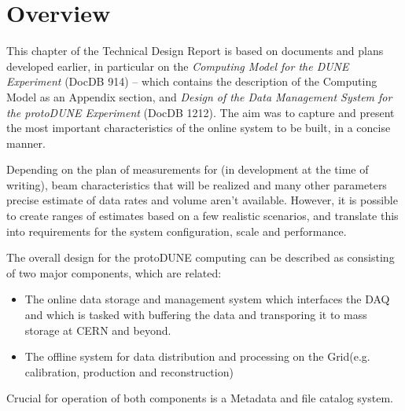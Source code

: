 \section{Overview}
This chapter of the Technical Design Report is based on documents and plans developed earlier, in particular
on the \textit{Computing Model for the DUNE Experiment} (DocDB 914) -- which contains the description
of the \pd Computing Model as an Appendix section, and \textit{Design of the Data Management System for the protoDUNE Experiment}
(DocDB 1212). The aim was to capture and present the most important characteristics of the online system to be built, in a concise manner.

Depending on the plan of measurements for \pd (in development at the time of writing), beam characteristics that will be realized
and many other parameters precise estimate of data rates and volume aren't available. However, it is possible to create ranges
of estimates based on a few realistic scenarios, and translate this into requirements for the system configuration, scale and
performance.

The overall design for the protoDUNE computing can be described as consisting of two major components, which are related:
\begin{itemize}
\item The online data storage and management system which interfaces the DAQ and which is tasked with buffering
the data and transporing it to mass storage at CERN and beyond.
\item The offline system for data distribution and processing on the Grid(e.g. calibration, production and reconstruction)
\end{itemize}

\noindent Crucial for operation of both components is a Metadata and file catalog system.


